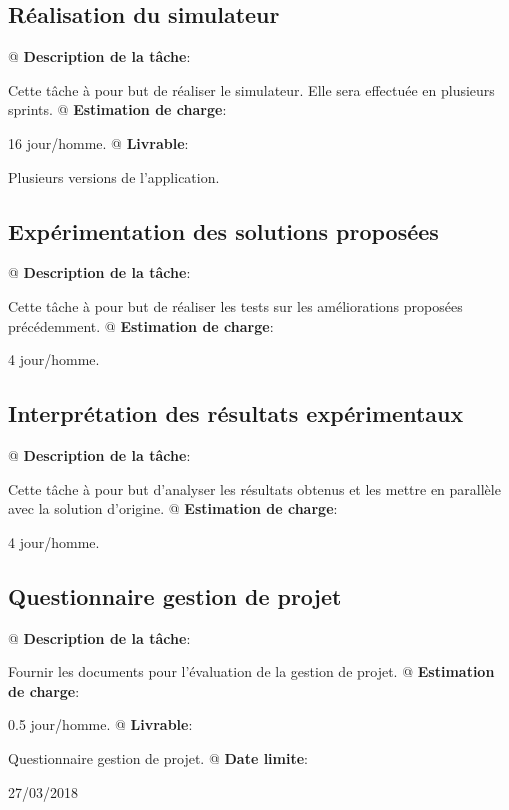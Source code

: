 \documentclass[final]{polytech/polytech}
\begin{document}
		\subsection{Réalisation du simulateur}
			\begin{easylist}
				@ \textbf{Description de la tâche}:
				
				Cette tâche à pour but de réaliser le simulateur.
				Elle sera effectuée en plusieurs sprints.
				@ \textbf{Estimation de charge}:
				
				16 jour/homme.
				@ \textbf{Livrable}:
				
				Plusieurs versions de l'application.
			\end{easylist}
			
		\subsection{Expérimentation des solutions proposées}
			\begin{easylist}
				@ \textbf{Description de la tâche}:
				
				Cette tâche à pour but de réaliser les tests sur les améliorations proposées précédemment.			
				@ \textbf{Estimation de charge}:
				
				4 jour/homme.
			\end{easylist}
			
		\subsection{Interprétation des résultats expérimentaux}
			\begin{easylist}
				@ \textbf{Description de la tâche}:
				
				Cette tâche à pour but d'analyser les résultats obtenus et les mettre en parallèle avec la solution d'origine.			
				@ \textbf{Estimation de charge}:
				
				4 jour/homme.
			\end{easylist}
			
		\subsection{Questionnaire gestion de projet}
			\begin{easylist}
				@ \textbf{Description de la tâche}:
				
				Fournir les documents pour l'évaluation de la gestion de projet.			
				@ \textbf{Estimation de charge}:
				
				0.5 jour/homme.
				@ \textbf{Livrable}:
				
				Questionnaire gestion de projet.
				@ \textbf{Date limite}:
				
				27/03/2018
			\end{easylist}
			
\end{document}
